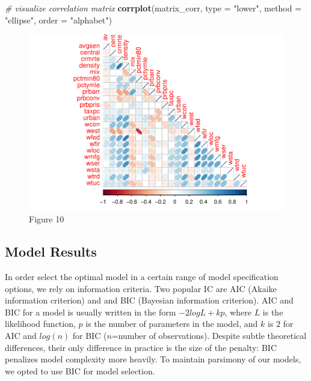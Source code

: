 \documentclass[]{article}
\newenvironment{Shaded}{\begin{snugshade}}{\end{snugshade}}
\newcommand{\CommentTok}[1]{\textcolor[rgb]{0.56,0.35,0.01}{\textit{#1}}}
\newcommand{\DataTypeTok}[1]{\textcolor[rgb]{0.13,0.29,0.53}{#1}}
\newcommand{\KeywordTok}[1]{\textcolor[rgb]{0.13,0.29,0.53}{\textbf{#1}}}
\newcommand{\NormalTok}[1]{#1}
\newcommand{\StringTok}[1]{\textcolor[rgb]{0.31,0.60,0.02}{#1}}
\begin{document}
\begin{Shaded}
\begin{Highlighting}[]
\CommentTok{# visualize correlation matrix }
\KeywordTok{corrplot}\NormalTok{(matrix_corr, }\DataTypeTok{type =} \StringTok{"lower"}\NormalTok{, }\DataTypeTok{method =} \StringTok{"ellipse"}\NormalTok{, }\DataTypeTok{order =} \StringTok{"alphabet"}\NormalTok{)}
\end{Highlighting}
\end{Shaded}

\begin{figure}

{\centering \includegraphics{lab_3_v7_files/figure-latex/unnamed-chunk-32-1} 

}

\caption{Figure 10}\label{fig:unnamed-chunk-32}
\end{figure}

\hypertarget{model-results}{%
\subsection{Model Results}\label{model-results}}

In order select the optimal model in a certain range of model
specification options, we rely on information criteria. Two popular IC
are AIC (Akaike information criterion) and and BIC (Bayesian information
criterion). AIC and BIC for a model is usually written in the form
\(-2logL + kp\), where \(L\) is the likelihood function, \(p\) is the
number of parameters in the model, and \(k\) is \(2\) for AIC and
\(log(n)\) for BIC (\(n\)=number of observations). Despite subtle
theoretical differences, their only difference in practice is the size
of the penalty: BIC penalizes model complexity more heavily. To maintain
parsimony of our models, we opted to use BIC for model selection.
\end{document}
